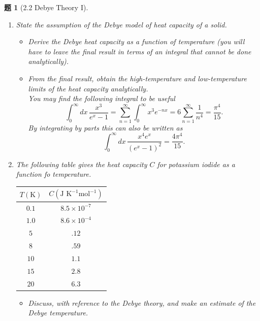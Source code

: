 \documentclass[UTF8,10pt,a4paper]{article}
\theoremstyle{Problem}
\newtheorem{prob}{题}
\theoremstyle{Solution}
\begin{document}
\begin{prob}[2.2 Debye Theory I]
    \begin{enumerate}
        \item[(a)$\ddagger$] State the assumption of the Debye model of heat capacity of a solid.
              \begin{itemize}
                  \item[$\triangleright$] Derive the Debye heat capacity as a function of temperature (you will have to leave the final result in terms of an integral that cannot be done analytically).
                  \item[$\triangleright$] From the final result, obtain the high-temperature and low-temperature limits of the heat capacity analytically.\\
                        You may find the following integral to be useful
                        \[
                            \int_0^{\infty}dx\,\frac{x^3}{e^x-1}=\sum_{n=1}^{\infty}\int_0^{\infty}x^3e^{-nx}=6\sum_{n=1}^{\infty}\frac{1}{n^4}=\frac{\pi^4}{15}.
                        \]
                        By integrating by parts this can also be written as
                        \[
                            \int_0^{\infty}dx\,\frac{x^4e^x}{(e^x-1)^2}=\frac{4\pi^4}{15}.
                        \]
              \end{itemize}
        \item[(b)] The following table gives the heat capacity $C$ for potassium iodide as a function fo temperature.
              \begin{table}[h]
                  \centering
                  \begin{tabular}{cc}
                      \toprule
                      $T(\text{K})$ & $C(\text{J K}^{-1}\text{mol}^{-1})$ \\ \midrule
                      $0.1$         & $8.5\times 10^{-7}$                 \\
                      $1.0$         & $8.6\times 10^{-4}$                 \\
                      $5$           & $.12$                               \\
                      $8$           & $.59$                               \\
                      $10$          & $1.1$                               \\
                      $15$          & $2.8$                               \\
                      $20$          & $6.3$                               \\ \bottomrule
                  \end{tabular}
              \end{table}
              \begin{itemize}
                  \item[$\triangleright$] Discuss, with reference to the Debye theory, and make an estimate of the Debye temperature.
              \end{itemize}
    \end{enumerate}
\end{prob}
\end{document}
